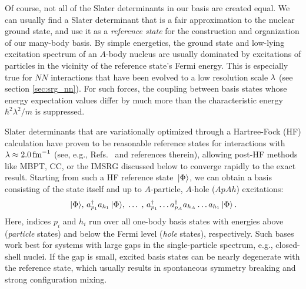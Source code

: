 Of course, not all of the Slater determinants in our basis are created equal. 
We can usually find a Slater determinant that is a fair approximation 
to the nuclear ground state, and use it as a \emph{reference state} for the 
construction and organization of our many-body basis. By simple energetics, the 
ground state and low-lying excitation spectrum of an $A$-body nucleus are usually 
dominated by excitations of particles in the vicinity of the reference state's 
Fermi energy. This is especially true for $NN$ interactions that have
been evolved to a low resolution scale $\lambda$ (see section 
\ref{sec:srg_nn}). For such forces, the coupling between basis states whose
energy expectation values differ by much more than the characteristic energy 
$\hbar^2\lambda^2/m$ is suppressed. 

Slater determinants that are variationally optimized through a Hartree-Fock 
(HF) calculation have proven to be reasonable reference states for interactions 
with $\lambda\approx2.0\,\text{fm}^{-1}$ (see, e.g., Refs.~\cite{Bogner:2010pq,Roth:2010vp,Barrett:2013oq,Hagen:2014ve,Hergert:2016jk,Tichai:2016vl} and references therein), allowing post-HF methods like MBPT, 
CC, or the IMSRG discussed below to converge rapidly to the exact result. 
Starting from such a HF reference state $\,|{\Phi}\rangle$, we can obtain 
a basis consisting of the state itself and up to $A$-particle, $A$-hole ($ApAh$) 
excitations:
\begin{equation}
  \,|{\Phi}\rangle,\,a^\dag_{p_1}a_{h_1}\,|{\Phi}\rangle,\;\ldots\;,\,a^\dag_{p_1}\ldots a^\dag_{p_A}a_{h_A}\ldots a_{h_1}\,|{\Phi}\rangle\,.
\end{equation}
Here, indices $p_i$ and $h_i$ run over all one-body basis states with energies above 
(\emph{particle} states) and below the Fermi level (\emph{hole} states), respectively.
Such bases work best for systems with large gaps in the single-particle 
spectrum, e.g., closed-shell nuclei. If the gap is small, excited basis 
states can be nearly degenerate with the reference state, which usually 
results in spontaneous symmetry breaking and strong configuration mixing.

